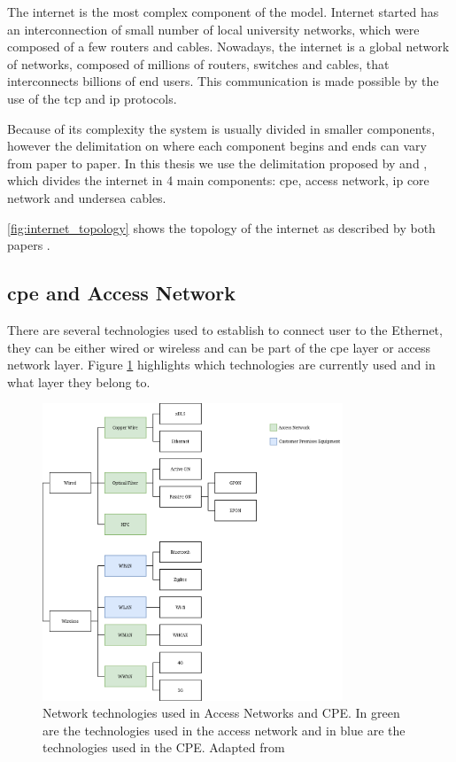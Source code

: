 The internet is the most complex component of the model.
Internet started has an interconnection of small number of local university networks, which were composed of a few routers and cables. Nowadays, the internet is a global network of networks, composed of millions of routers, switches and cables, that interconnects billions of end users. This communication is made possible by the use of the \ac{tcp} and \ac{ip} protocols.

Because of its complexity the system is usually divided in smaller components, however the delimitation on where each component begins and ends can vary from paper to paper. In this thesis we use the delimitation proposed by \citet{Coroama2015} and \citet{Schien2015}, which divides the internet in 4 main components: \ac{cpe}, access network, \ac{ip} core network and undersea cables.

\ref{fig:internet_topology} shows the topology of the internet as described by both papers \cite{Coroama2015} \cite{Schien2015}. 

\subsection{\acl{cpe} and Access Network}

There are several technologies used to establish to connect user to the Ethernet, they can be either wired or wireless and can be part of the \ac{cpe} layer or access network layer. Figure \ref{figure:network_technologies} highlights which technologies are currently used and in what layer they belong to.

\begin{figure}[h]
    \centering
    \includegraphics[width=0.8\textwidth]{figs/network_technologies.png}
    \caption[Network technologies used in Access Networks and CPE]{Network technologies used in Access Networks and CPE. In green are the technologies used in the access network and in blue are the technologies used in the CPE. Adapted from \citet{forum:huwawei}}
    \label{figure:network_technologies}
\end{figure}

